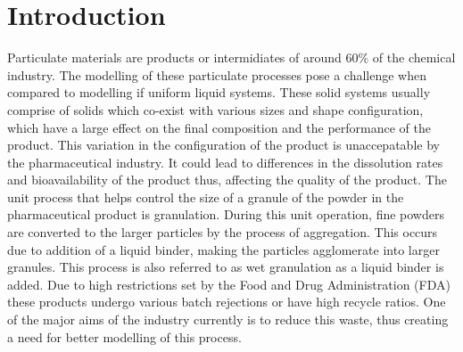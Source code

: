 \documentclass[fleqn,twoside,10pt]{article}
\begin{document}

\section{Introduction}

Particulate materials are products or intermidiates of around $60\%$ of the chemical industry\citep{ingram2005}.
The modelling of these particulate processes pose a challenge when compared to modelling if uniform liquid
systems. These solid systems usually comprise of solids which co-exist with various sizes and shape configuration,
which have a large effect on the final composition and the performance of the product. This variation in the 
configuration of the product is unaccepatable by the pharmaceutical industry. It could lead to differences in the 
dissolution rates and bioavailability of the product thus, affecting the quality of the product. The unit process 
that helps control the size of a granule of the powder in the pharmaceutical product is granulation. During this 
unit operation, fine powders are converted to the  larger particles by the process of aggregation. This occurs
due to addition of a liquid binder, making the particles agglomerate into larger granules. This process is also 
referred to as wet granulation as a liquid binder is added. Due to high restrictions set by the Food and Drug 
Administration (FDA) these products undergo various batch rejections or have high recycle ratios\citep{sen2014}. 
One of the major aims of the industry currently is to reduce this waste, thus creating a need for better 
modelling of this process.
\end{document}
